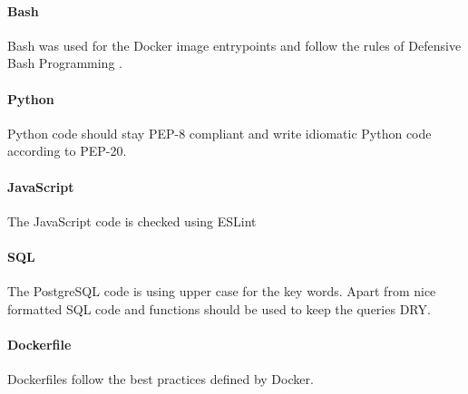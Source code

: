 \paragraph{Bash} Bash was used for the Docker image entrypoints and follow
the rules of Defensive Bash Programming \cite{pm_10_lavi_2012}.

\paragraph{Python} Python code should stay PEP-8\cite{pm_11_python.org_2015} compliant and write idiomatic Python code according to PEP-20\cite{pm_12_python.org_2015}.

\paragraph{JavaScript} The JavaScript code is checked using ESLint\cite{pm_13_eslint.org_2015}

\paragraph{SQL} The PostgreSQL code is using upper case for the key words. Apart from nice formatted SQL code and functions should be used
to keep the queries DRY\cite{pm_14_wikipedia_2015}.

\paragraph{Dockerfile} Dockerfiles follow the best practices\cite{pm_15_docs.docker.com_2015} defined by Docker.
